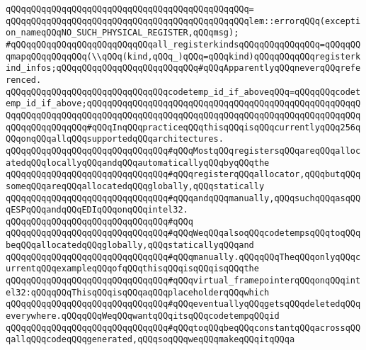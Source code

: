 \verb|qQQqqQQqqQQqqQQqqQQqqQQqqQQqqQQqqQQqqQQqqQQqqQQq=|\newline
\verb|qQQqqQQqqQQqqQQqqQQqqQQqqQQqqQQqqQQqqQQqqQQqqQQqlem::errorqQQq(exception_nameqQQqNO_SUCH_PHYSICAL_REGISTER,qQQqmsg);|\newline
\newline
\verb|#qQQqqQQqqQQqqQQqqQQqqQQqqQQqall_registerkindsqQQqqQQqqQQqqQQq=qQQqqQQqmapqQQqqQQqqQQq(\\qQQq(kind,qQQq_)qQQq=qQQqkind)qQQqqQQqqQQqregisterkind_infos;qQQqqQQqqQQqqQQqqQQqqQQqqQQq#qQQqApparentlyqQQqneverqQQqreferenced.|\newline
\newline
\verb|qQQqqQQqqQQqqQQqqQQqqQQqqQQqqQQqcodetemp_id_if_aboveqQQq=qQQqqQQqcodetemp_id_if_above;qQQqqQQqqQQqqQQqqQQqqQQqqQQqqQQqqQQqqQQqqQQqqQQqqQQqqQQqqQQqqQQqqQQqqQQqqQQqqQQqqQQqqQQqqQQqqQQqqQQqqQQqqQQqqQQqqQQqqQQqqQQqqQQqqQQqqQQqqQQq#qQQqInqQQqpracticeqQQqthisqQQqisqQQqcurrentlyqQQq256qQQqonqQQqallqQQqsupportedqQQqarchitectures.|\newline
\newline
\verb|qQQqqQQqqQQqqQQqqQQqqQQqqQQqqQQq#qQQqMostqQQqregistersqQQqareqQQqallocatedqQQqlocallyqQQqandqQQqautomaticallyqQQqbyqQQqthe|\newline
\verb|qQQqqQQqqQQqqQQqqQQqqQQqqQQqqQQq#qQQqregisterqQQqallocator,qQQqbutqQQqsomeqQQqareqQQqallocatedqQQqglobally,qQQqstatically|\newline
\verb|qQQqqQQqqQQqqQQqqQQqqQQqqQQqqQQq#qQQqandqQQqmanually,qQQqsuchqQQqasqQQqESPqQQqandqQQqEDIqQQqonqQQqintel32.|\newline
\verb|qQQqqQQqqQQqqQQqqQQqqQQqqQQqqQQq#qQQq|\newline
\verb|qQQqqQQqqQQqqQQqqQQqqQQqqQQqqQQq#qQQqWeqQQqalsoqQQqcodetempsqQQqtoqQQqbeqQQqallocatedqQQqglobally,qQQqstaticallyqQQqand|\newline
\verb|qQQqqQQqqQQqqQQqqQQqqQQqqQQqqQQq#qQQqmanually.qQQqqQQqTheqQQqonlyqQQqcurrentqQQqexampleqQQqofqQQqthisqQQqisqQQqisqQQqthe|\newline
\verb|qQQqqQQqqQQqqQQqqQQqqQQqqQQqqQQq#qQQqvirtual_framepointerqQQqonqQQqintel32:qQQqqQQqThisqQQqisqQQqaqQQqplaceholderqQQqwhich|\newline
\verb|qQQqqQQqqQQqqQQqqQQqqQQqqQQqqQQq#qQQqeventuallyqQQqgetsqQQqdeletedqQQqeverywhere.qQQqqQQqWeqQQqwantqQQqitsqQQqcodetempqQQqid|\newline
\verb|qQQqqQQqqQQqqQQqqQQqqQQqqQQqqQQq#qQQqtoqQQqbeqQQqconstantqQQqacrossqQQqallqQQqcodeqQQqgenerated,qQQqsoqQQqweqQQqmakeqQQqitqQQqa|\newline
